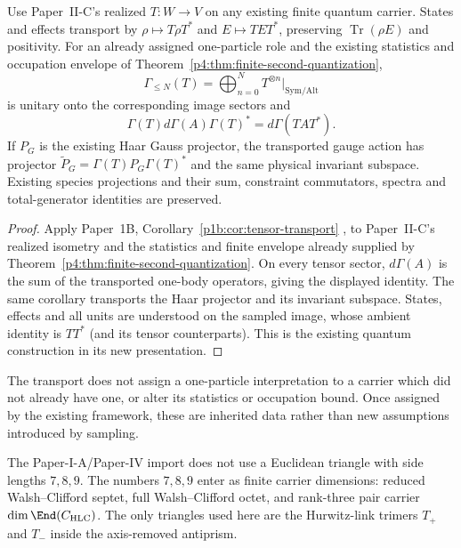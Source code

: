 \documentclass[12pt,a4paper]{article}
\begin{document}
\begin{corollary}
\label{p4:cor:v204-quantum-sampled-transport}
Use Paper~II-C's realized $T:W\to V$ on any existing finite quantum carrier.
States and effects transport by $\rho\mapsto T\rho T^*$ and
$E\mapsto TET^*$, preserving $\operatorname{Tr}(\rho E)$ and positivity.
For an already assigned one-particle role and the existing statistics and
occupation envelope of Theorem~\ref{p4:thm:finite-second-quantization},
\[
 \Gamma_{\le N}(T)=\bigoplus_{n=0}^N T^{\otimes n}|_{\mathrm{Sym/Alt}}
\]
is unitary onto the corresponding image sectors and
\[
 \Gamma(T)d\Gamma(A)\Gamma(T)^*=d\Gamma(TAT^*).
\]
If $P_G$ is the existing Haar Gauss projector, the transported gauge action
has projector $\widetilde P_G=\Gamma(T)P_G\Gamma(T)^*$ and the same
physical invariant subspace. Existing species projections and their sum,
constraint commutators, spectra and total-generator identities are preserved.
\end{corollary}
\begin{proof}
Apply Paper~1B, Corollary~\ref{p1b:cor:tensor-transport}
\cite{Kugelmann2026Paper1B}, to Paper~II-C's realized isometry and the
statistics and finite envelope already supplied by
Theorem~\ref{p4:thm:finite-second-quantization}. On every tensor sector,
$d\Gamma(A)$ is the sum of the transported one-body operators, giving
the displayed identity. The same corollary transports the Haar projector
and its invariant subspace. States, effects and all units are understood
on the sampled image, whose ambient identity is $TT^*$ (and its tensor
counterparts). This is the existing quantum construction in its new
presentation.
\end{proof}
The transport does not assign a one-particle interpretation to a carrier
which did not already have one, or alter its statistics or occupation bound.
Once assigned by the existing framework, these are inherited data rather
than new assumptions introduced by sampling.

\begin{remark}
\label{p4:rem:no-scalene-carrier-triangle}
The Paper-I-A/Paper-IV import does not use a Euclidean triangle with side lengths \(7,8,9\).  The numbers \(7,8,9\) enter as finite carrier dimensions: reduced Walsh--Clifford septet, full Walsh--Clifford octet, and rank-three pair carrier \(\dim\End(C_{\rm HLC})\).  The only triangles used here are the Hurwitz-link trimers \(T_+\) and \(T_-\) inside the axis-removed antiprism.
\end{remark}
\end{document}
